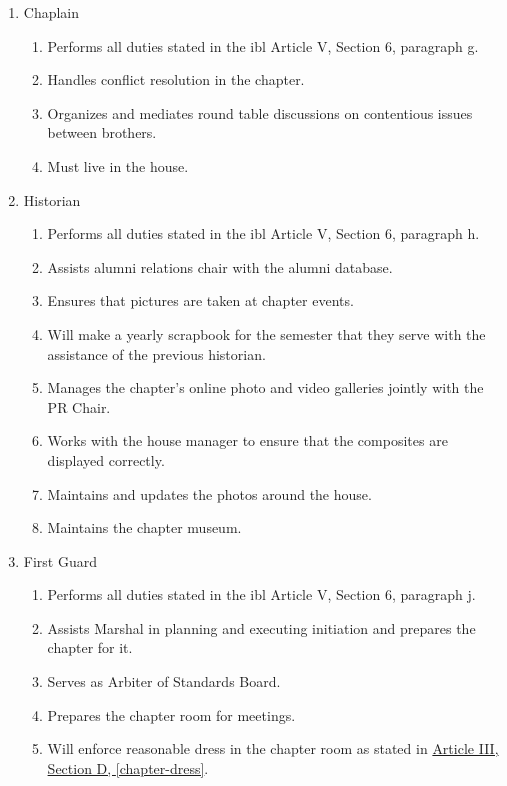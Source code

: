\begin{enumerate}
		\item Chaplain
			\begin{enumerate}
				\item Performs all duties stated in the \gls{ibl} Article V, Section 6, paragraph g.
				\item Handles conflict resolution in the chapter.
				\item Organizes and mediates round table discussions on contentious issues between brothers.
				\item Must live in the house.
			\end{enumerate}

		\item Historian
			\begin{enumerate}
				\item Performs all duties stated in the \gls{ibl} Article V, Section 6, paragraph h.
				\item Assists alumni relations chair with the alumni database.
				\item Ensures that pictures are taken at chapter events.
				\item Will make a yearly scrapbook for the semester that they serve with the assistance of the previous historian.
				\item Manages the chapter's online photo and video galleries jointly with the PR Chair.
				\item Works with the house manager to ensure that the composites are displayed correctly.
				\item Maintains and updates the photos around the house.
				\item Maintains the chapter museum.
			\end{enumerate}

		\item First Guard
			\begin{enumerate}
				\item Performs all duties stated in the \gls{ibl} Article V, Section 6, paragraph j.
				\item Assists Marshal in planning and executing initiation and prepares the chapter for it.
				\item Serves as Arbiter of Standards Board.
				\item Prepares the chapter room for meetings.
				\item Will enforce reasonable dress in the chapter room as stated in \hyperref[chapter-dress]{Article III, Section D, \autoref*{chapter-dress}}.
			\end{enumerate}


\end{enumerate}
